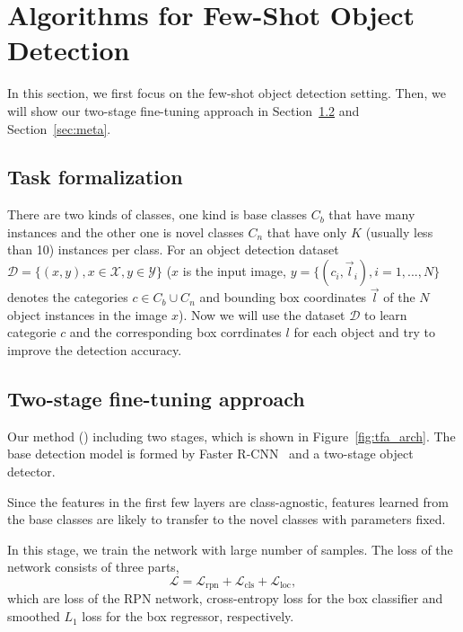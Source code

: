\vspace{-0.3cm}
\section{Algorithms for Few-Shot Object Detection}

In this section, we first focus on the few-shot object detection setting. Then, we will show our two-stage fine-tuning approach in
Section~\ref{sec:tfa} and Section~\ref{sec:meta}.

\subsection{Task formalization}
There are two kinds of classes, one kind is base classes $C_b$ that have many instances and the other one is novel classes $C_n$ that have only $K$ (usually less than 10) instances per class.
For an object detection dataset $\mathcal{D}=\{(x, y), x\in\mathcal{X}, y\in\mathcal{Y}\}$ ($x$
is the input image, $y=\{(c_i, \vec{l}_i), i=1, ...,N\}$ denotes the categories $c \in C_b \cup C_n$
and bounding box coordinates $\vec{l}$ of the $N$ object instances in the image $x$). Now we will use the dataset $\mathcal{D}$ to learn categorie $c$ and the corresponding box corrdinates $l$ for each object and try to improve the detection accuracy.

\subsection{Two-stage fine-tuning approach}
\label{sec:tfa}
Our method (\model) including two stages, which is shown in Figure~\ref{fig:tfa_arch}. The base detection model is formed by Faster R-CNN~\cite{ren2015faster} and a two-stage object detector.

Since the features in the first few layers are class-agnostic, features learned from the base classes are likely to transfer to the novel classes with parameters fixed.

 In this stage, we train the network with large number of samples. The loss of the network consists of three parts,
\begin{equation}
    \mathcal{L} = \mathcal{L}_{\text{rpn}} + \mathcal{L}_{\text{cls}} + \mathcal{L}_{\text{loc}},
    \label{eq:loss}
\end{equation}
which are loss of the RPN network, cross-entropy loss for the box classifier and smoothed $L_1$ loss for the box regressor, respectively.

